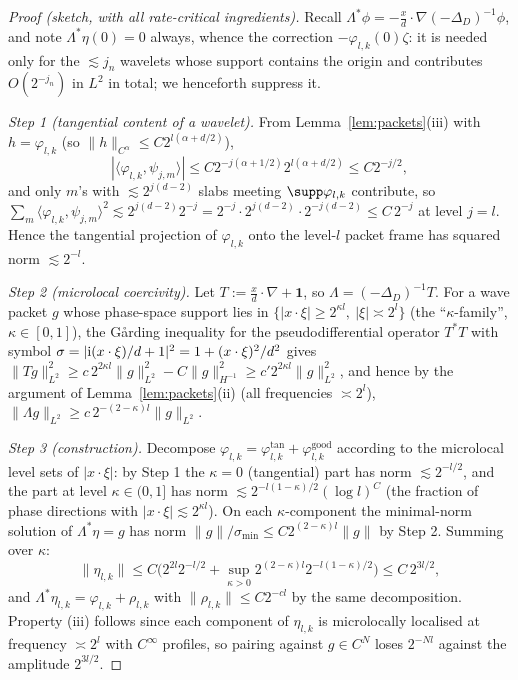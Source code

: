 \documentclass[11pt]{amsart}
\newcommand{\1}{\mathbf{1}}
\begin{document}
\begin{proof}[Proof (sketch, with all rate-critical ingredients)]
Recall $\Lambda^*\phi=-\frac{x}{d}\cdot\nabla(-\Delta_D)^{-1}\phi$, and note
$\Lambda^*\eta(0)=0$ always, whence the correction
$-\varphi_{l,k}(0)\zeta$: it is needed only for the $\lesssim j_n$ wavelets
whose support contains the origin and contributes $O(2^{-j_n})$ in $L^2$ in
total; we henceforth suppress it.

\emph{Step 1 (tangential content of a wavelet).} From
Lemma~\ref{lem:packets}(iii) with $h=\varphi_{l,k}$ (so
$\|h\|_{C^\alpha}\le C2^{l(\alpha+d/2)}$),
\[
|\langle \varphi_{l,k},\psi_{j,m}\rangle|\le C2^{-j(\alpha+1/2)}2^{l(\alpha+d/2)}
\le C2^{-j/2},
\]
and only $m$'s with $\lesssim 2^{j(d-2)}$ slabs meeting $\supp\varphi_{l,k}$
contribute, so $\sum_m\langle\varphi_{l,k},\psi_{j,m}\rangle^2
\lesssim 2^{j(d-2)}2^{-j}=2^{-j}\cdot 2^{j(d-2)}\cdot 2^{-j(d-2)}
\le C\,2^{-j}$ at level $j=l$. Hence the tangential projection of
$\varphi_{l,k}$ onto the level-$l$ packet frame has squared norm
$\lesssim 2^{-l}$.

\emph{Step 2 (microlocal coercivity).} Let $T:=\frac{x}{d}\cdot\nabla+\1$,
so $\Lambda=(-\Delta_D)^{-1}T$. For a wave packet $g$ whose phase-space
support lies in $\{|x\cdot\xi|\ge 2^{\kappa l} ,\ |\xi|\asymp2^l\}$
(the ``$\kappa$-family'', $\kappa\in[0,1]$), the G{\aa}rding inequality for
the pseudodifferential operator $T^*T$ with symbol
$\sigma=|{\rm i}(x\cdot\xi)/d+1|^2=1+(x\cdot\xi)^2/d^2$ gives
$\|Tg\|^2_{L^2}\ge c\,2^{2\kappa l}\|g\|_{L^2}^2-C\|g\|_{H^{-1}}^2
\ge c'2^{2\kappa l}\|g\|^2_{L^2}$, and hence by the argument of
Lemma~\ref{lem:packets}(ii) (all frequencies $\asymp2^l$),
$\|\Lambda g\|_{L^2}\ge c\,2^{-(2-\kappa)l}\|g\|_{L^2}$.

\emph{Step 3 (construction).} Decompose
$\varphi_{l,k}=\varphi^{\mathrm{tan}}_{l,k}+\varphi^{\mathrm{good}}_{l,k}$
according to the microlocal level sets of $|x\cdot\xi|$: by Step 1 the
$\kappa=0$ (tangential) part has norm $\lesssim 2^{-l/2}$, and the part at
level $\kappa\in(0,1]$ has norm $\lesssim 2^{-l(1-\kappa)/2}(\log l)^C$
(the fraction of phase directions with $|x\cdot\xi|\lesssim2^{\kappa l}$).
On each $\kappa$-component the minimal-norm solution of
$\Lambda^*\eta=g$ has norm $\|g\|/\sigma_{\min}\le
C2^{(2-\kappa)l}\|g\|$ by Step 2. Summing over $\kappa$:
\[
\|\eta_{l,k}\|\le C\Big(2^{2l}2^{-l/2}+\sup_{\kappa>0}
2^{(2-\kappa)l}2^{-l(1-\kappa)/2}\Big)\le C\,2^{3l/2},
\]
and $\Lambda^*\eta_{l,k}=\varphi_{l,k}+\rho_{l,k}$ with
$\|\rho_{l,k}\|\le C2^{-cl}$ by the same decomposition. Property (iii)
follows since each component of $\eta_{l,k}$ is microlocally localised at
frequency $\asymp2^l$ with $C^\infty$ profiles, so pairing against
$g\in C^N$ loses $2^{-Nl}$ against the amplitude $2^{3l/2}$.
\end{proof}
\end{document}
